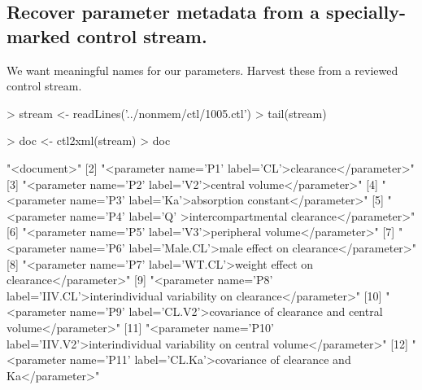 \subsection{Recover parameter metadata from a specially-marked control stream.}
We want meaningful names for our parameters.  Harvest these from a reviewed control
stream.
\begin{Schunk}
\begin{Sinput}
> stream <- readLines('../nonmem/ctl/1005.ctl')
> tail(stream)
\end{Sinput}
\begin{Sinput}
> doc <- ctl2xml(stream)
> doc
\end{Sinput}
\begin{Soutput}
 [1] "<document>"                                                                                    
 [2] "<parameter name='P1' label='CL'>clearance</parameter>"                                         
 [3] "<parameter name='P2' label='V2'>central volume</parameter>"                                    
 [4] "<parameter name='P3' label='Ka'>absorption constant</parameter>"                               
 [5] "<parameter name='P4' label='Q' >intercompartmental clearance</parameter>"                      
 [6] "<parameter name='P5' label='V3'>peripheral volume</parameter>"                                 
 [7] "<parameter name='P6' label='Male.CL'>male effect on clearance</parameter>"                     
 [8] "<parameter name='P7' label='WT.CL'>weight effect on clearance</parameter>"                     
 [9] "<parameter name='P8' label='IIV.CL'>interindividual variability on clearance</parameter>"      
[10] "<parameter name='P9' label='CL.V2'>covariance of clearance and central volume</parameter>"     
[11] "<parameter name='P10' label='IIV.V2'>interindividual variability on central volume</parameter>"
[12] "<parameter name='P11' label='CL.Ka'>covariance of clearance and Ka</parameter>"                

\end{Soutput}
\end{Schunk}
